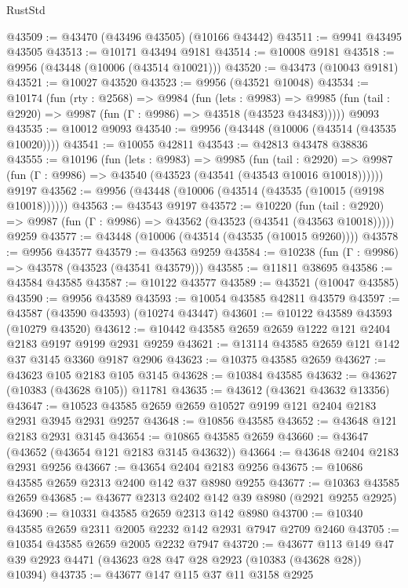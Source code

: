 \begin{lexlean}{RustStd}
\begin{coremodule}
@43509 := @43470 (@43496 @43505) (@10166 @43442)
@43511 := @9941 @43495 @43505
@43513 := @10171 @43494 @9181
@43514 := @10008 @9181
@43518 := @9956 (@43448 (@10006 (@43514 @10021)))
@43520 := @43473 (@10043 @9181)
@43521 := @10027 @43520
@43523 := @9956 (@43521 @10048)
@43534 := @10174
    (fun (rty : @2568) =>
    @9984
      (fun (lets : @9983) =>
      @9985 (fun (tail : @2920) => @9987 (fun (Γ : @9986) => @43518 (@43523 @43483)))))
    @9093
@43535 := @10012 @9093
@43540 := @9956 (@43448 (@10006 (@43514 (@43535 @10020))))
@43541 := @10055 @42811
@43543 := @42813 @43478 @38836
@43555 := @10196
    (fun (lets : @9983) =>
    @9985
      (fun (tail : @2920) =>
      @9987 (fun (Γ : @9986) => @43540 (@43523 (@43541 (@43543 @10016 @10018))))))
    @9197
@43562 := @9956 (@43448 (@10006 (@43514 (@43535 (@10015 (@9198 @10018))))))
@43563 := @43543 @9197
@43572 := @10220
    (fun (tail : @2920) => @9987 (fun (Γ : @9986) => @43562 (@43523 (@43541 (@43563 @10018)))))
    @9259
@43577 := @43448 (@10006 (@43514 (@43535 (@10015 @9260))))
@43578 := @9956 @43577
@43579 := @43563 @9259
@43584 := @10238 (fun (Γ : @9986) => @43578 (@43523 (@43541 @43579)))
@43585 := @11811 @38695
@43586 := @43584 @43585
@43587 := @10122 @43577
@43589 := @43521 (@10047 @43585)
@43590 := @9956 @43589
@43593 := @10054 @43585 @42811 @43579
@43597 := @43587 (@43590 @43593) (@10274 @43447)
@43601 := @10122 @43589 @43593 (@10279 @43520)
@43612 := @10442 @43585 @2659 @2659 @1222 @121 @2404 @2183 @9197 @9199 @2931 @9259
@43621 := @13114 @43585 @2659 @121 @142 @37 @3145 @3360 @9187 @2906
@43623 := @10375 @43585 @2659
@43627 := @43623 @105 @2183 @105 @3145
@43628 := @10384 @43585
@43632 := @43627 (@10383 (@43628 @105)) @11781
@43635 := @43612 (@43621 @43632 @13356)
@43647 := @10523 @43585 @2659 @2659 @10527 @9199 @121 @2404 @2183 @2931 @3945 @2931 @9257
@43648 := @10856 @43585
@43652 := @43648 @121 @2183 @2931 @3145
@43654 := @10865 @43585 @2659
@43660 := @43647 (@43652 (@43654 @121 @2183 @3145 @43632))
@43664 := @43648 @2404 @2183 @2931 @9256
@43667 := @43654 @2404 @2183 @9256
@43675 := @10686 @43585 @2659 @2313 @2400 @142 @37 @8980 @9255
@43677 := @10363 @43585 @2659
@43685 := @43677 @2313 @2402 @142 @39 @8980 (@2921 @9255 @2925)
@43690 := @10331 @43585 @2659 @2313 @142 @8980
@43700 := @10340 @43585 @2659 @2311 @2005 @2232 @142 @2931 @7947 @2709 @2460
@43705 := @10354 @43585 @2659 @2005 @2232 @7947
@43720 := @43677
    @113
    @149
    @47
    @39
    @2923
    @4471
    (@43623 @28 @47 @28 @2923 (@10383 (@43628 @28)) @10394)
@43735 := @43677
    @147
    @115
    @37
    @11
    @3158
    @2925

\end{coremodule}
\end{lexlean}
